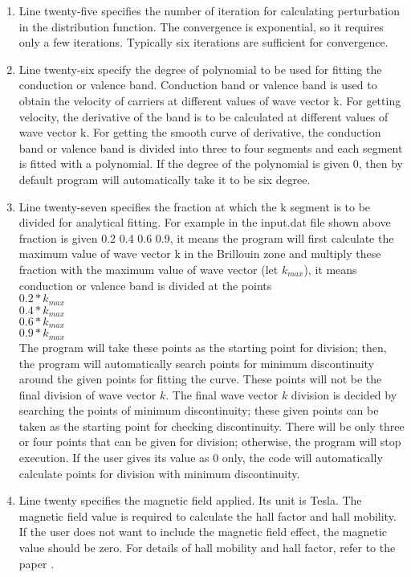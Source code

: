 \documentclass[12pt]{article}
\begin{document}
\begin{enumerate}
\begin{enumerate}[label=\Roman*]
\item Line twenty-five specifies the number of iteration for calculating perturbation in the distribution function. The convergence is exponential, so it requires only a few iterations. Typically six iterations are sufficient for convergence.

\item Line twenty-six specify the degree of polynomial to be used for fitting the conduction or valence band. Conduction band or valence band is used to obtain the velocity of carriers at different values of wave vector k. For getting velocity, the derivative of the band is to be calculated at different values of wave vector k. For getting the smooth curve of derivative, the conduction band or valence band is divided into three to four segments and each segment is fitted with a polynomial. If the degree of the polynomial is given 0, then by default program will automatically take it to be six degree.   

\item Line twenty-seven specifies the fraction at which the k segment is to be divided for analytical fitting. For example in the input.dat file shown above fraction is given 0.2 0.4 0.6 0.9, it means the program will first calculate the maximum value of wave vector k in the Brillouin zone and multiply these fraction with the maximum value of wave vector (let $k_{max}$), it means conduction or valence band is divided at the points \\ 

$0.2*k_{max}$ \\
$0.4*k_{max}$ \\
$0.6*k_{max}$ \\
$0.9*k_{max}$ \\

The program will take these points as the starting point for division; then, the program will automatically search points for minimum discontinuity around the given points for fitting the curve. These points will not be the final division of wave vector $k$. The final wave vector $k$ division is decided by searching the points of minimum discontinuity; these given points can be taken as the starting point for checking discontinuity. There will be only three or four points that can be given for division; otherwise, the program will stop execution. If the user gives its value as 0 only, the code will automatically calculate points for division with minimum discontinuity.       

\item Line twenty specifies the magnetic field applied. Its unit is Tesla. The magnetic field value is required to calculate the hall factor and hall mobility. If the user does not want to include the magnetic field effect, the magnetic value should be zero. For details of hall mobility and hall factor, refer to the paper \cite{rode4}.


\end{enumerate}
\end{enumerate}
\end{document}
